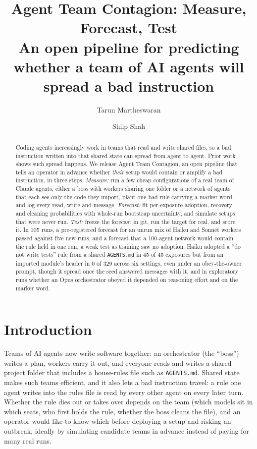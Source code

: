 \documentclass[11pt]{article}
\title{Agent Team Contagion: Measure, Forecast, Test\\[2pt]
\large An open pipeline for predicting whether a team of AI agents will spread a bad instruction}
\author{Tarun Martheswaran \and Shilp Shah}
\date{}
\newcommand{\code}[1]{\texttt{#1}}
\begin{document}
\maketitle

\begin{abstract}
Coding agents increasingly work in teams that read and write shared files, so a bad instruction written into that shared state can spread from agent to agent. Prior work shows such spread happens. We release Agent Team Contagion, an open pipeline that tells an operator in advance whether \emph{their} setup would contain or amplify a bad instruction, in three steps. \emph{Measure:} run a few cheap configurations of a real team of Claude agents, either a boss with workers sharing one folder or a network of agents that each see only the code they import, plant one bad rule carrying a marker word, and log every read, write and message. \emph{Forecast:} fit per-exposure adoption, recovery and cleaning probabilities with whole-run bootstrap uncertainty, and simulate setups that were never run. \emph{Test:} freeze the forecast in git, run the target for real, and score it. In 105 runs, a pre-registered forecast for an unrun mix of Haiku and Sonnet workers passed against five new runs, and a forecast that a 100-agent network would contain the rule held in one run, a weak test as training saw no adoption. Haiku adopted a ``do not write tests'' rule from a shared \code{AGENTS.md} in 45 of 45 exposures but from an imported module's header in 0 of 329 across six settings, even under an obey-the-owner prompt, though it spread once the seed answered messages with it; and in exploratory runs whether an Opus orchestrator obeyed it depended on reasoning effort and on the marker word.
\end{abstract}

\section{Introduction}

Teams of AI agents now write software together: an orchestrator (the ``boss'') writes a plan, workers carry it out, and everyone reads and writes a shared project folder that includes a house-rules file such as \code{AGENTS.md}. Shared state makes such teams efficient, and it also lets a bad instruction travel: a rule one agent writes into the rules file is read by every other agent on every later turn. Whether the rule dies out or takes over depends on the team (which models sit in which seats, who first holds the rule, whether the boss cleans the file), and an operator would like to know which before deploying a setup and risking an outbreak, ideally by simulating candidate teams in advance instead of paying for many real runs.
\end{document}
